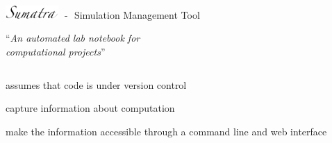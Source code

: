 \documentclass[xcolor=svgnames,11pt]{beamer}
\begin{document}
\begin{frame}{\includegraphics[width=2.0cm]{sumatra_logo_up.png}
     \textcolor{white}{-}- \textcolor{white}{-}Simulation Management
     Tool}

   \large
   \vspace{0.3cm}
   \begin{center}
     \enquote{\textit{An automated lab notebook for\\ computational projects}}
   \end{center}

   \vspace{-0.15cm}
   \begin{center}
   \end{center}

   \vspace{0.2cm}
   \begin{columns}
     \begin{column}{0.58\textwidth}
       \begin{arrowlist}
         \itemsep14pt
         \item<4-> assumes that code is under version control
         \item<6-> capture information about computation
         \item<7-> make the information accessible through a command line
           and web interface
       \end{arrowlist}
       \vspace{1cm}


\end{column}
\end{columns}
\end{frame}
\end{document}
